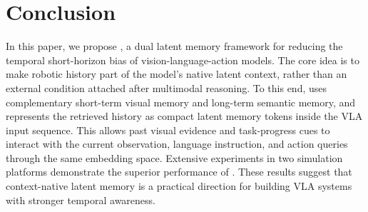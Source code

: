\section{Conclusion}
\label{sec:conclusion}
In this paper, we propose \ourmethod, a dual latent memory framework for reducing the temporal short-horizon bias of vision-language-action models. The core idea is to make robotic history part of the model's native latent context, rather than an external condition attached after multimodal reasoning. To this end, \ourmethod uses complementary short-term visual memory and long-term semantic memory, and represents the retrieved history as compact latent memory tokens inside the VLA input sequence. This allows past visual evidence and task-progress cues to interact with the current observation, language instruction, and action queries through the same embedding space. 
Extensive experiments in two simulation platforms demonstrate the superior performance of \ourmethod.
These results suggest that context-native latent memory is a practical direction for building VLA systems with stronger temporal awareness. %